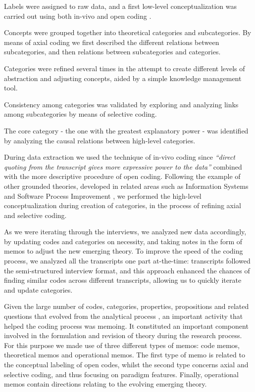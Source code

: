 \documentclass[10pt,journal,letterpaper,compsoc]{IEEEtran}
\begin{document}
\begin{compactitem}

\item Labels were assigned to raw data, and a first low-level conceptualization was carried out using both in-vivo and open coding \cite{ColinRobson2009}.
\item Concepts were grouped together into theoretical categories and subcategories. By means of axial coding we first described the different relations between subcategories, and then relations between subcategories and categories.
\item Categories were refined several times in the attempt to create different levels of abstraction and adjusting concepts, aided by a simple knowledge management tool.
\item Consistency among categories was validated by exploring and analyzing links among subcategories by means of selective coding.
\item The core category - the one with the greatest explanatory power -  was identified by analyzing the causal relations between high-level categories.
\end{compactitem}


During data extraction we used the technique of in-vivo coding since \textit{``direct quoting from the transcript gives more expressive power to the data''} \cite{ColinRobson2009} combined with the more descriptive procedure of open coding. Following the example of other grounded theories, developed in related areas such as Information Systems \cite{Orlikowski1993} and Software Process Improvement \cite{Coleman2006}, we performed the high-level conceptualization during creation of categories, in the process of refining axial and selective coding.

As we were iterating through the interviews, we analyzed new data accordingly, by updating codes and categories on necessity, and taking notes in the form of memos to adjust the new emerging theory. To improve the speed of the coding process, we analyzed all the transcripts one part at-the-time: transcripts followed the semi-structured interview format, and this approach enhanced the chances of finding similar codes across different transcripts, allowing us to quickly iterate and update categories.

Given the large number of codes, categories, properties, propositions and related questions that evolved from the analytical process \cite{Corbin1990}, an important activity that helped the coding process was memoing. It constituted an important component involved in the formulation and revision of theory during the research process. For this purpose we made use of three different types of memos: code memos, theoretical memos and operational memos. The first type of memo is related to the conceptual labeling of open codes, whilst the second type concerns axial and selective coding, and thus focusing on paradigm features. Finally, operational memos contain directions relating to the evolving emerging theory.
\end{document}
